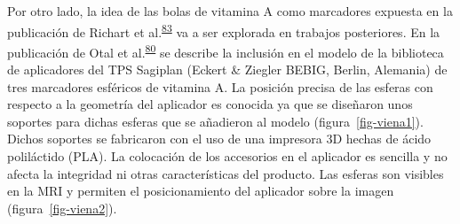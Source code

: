 \documentclass[
  a4paper,
]{scrreprt}
\begin{document}
Por otro lado, la idea de las bolas de vitamina A como marcadores
expuesta en la publicación de Richart et
al.\textsuperscript{\protect\hyperlink{ref-richart2015}{83}} va a ser
explorada en trabajos posteriores. En la publicación de Otal et
al.\textsuperscript{\protect\hyperlink{ref-otal2017}{80}} se describe la
inclusión en el modelo de la biblioteca de aplicadores del TPS Sagiplan
(Eckert \& Ziegler BEBIG, Berlin, Alemania) de tres marcadores esféricos
de vitamina A. La posición precisa de las esferas con respecto a la
geometría del aplicador es conocida ya que se diseñaron unos soportes
para dichas esferas que se añadieron al modelo
(figura~\ref{fig-viena1}). Dichos soportes se fabricaron con el uso de
una impresora 3D hechas de ácido poliláctido (PLA). La colocación de los
accesorios en el aplicador es sencilla y no afecta la integridad ni
otras características del producto. Las esferas son visibles en la MRI y
permiten el posicionamiento del aplicador sobre la imagen
(figura~\ref{fig-viena2}).
\end{document}
